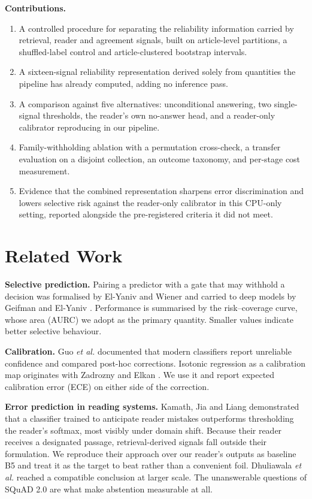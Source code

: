 \documentclass[conference]{IEEEtran}
\begin{document}
\noindent\textbf{Contributions.}
\begin{enumerate}\itemsep0.5pt
\item A controlled procedure for separating the reliability information carried by
retrieval, reader and agreement signals, built on article-level partitions, a
shuffled-label control and article-clustered bootstrap intervals.
\item A sixteen-signal reliability representation derived solely from quantities
the pipeline has already computed, adding no inference pass.
\item A comparison against five alternatives: unconditional answering, two
single-signal thresholds, the reader's own no-answer head, and a reader-only
calibrator reproducing \cite{kamath2020} in our pipeline.
\item Family-withholding ablation with a permutation cross-check, a transfer
evaluation on a disjoint collection, an outcome taxonomy, and per-stage cost
measurement.
\item Evidence that the combined representation sharpens error discrimination and
lowers selective risk against the reader-only calibrator in this CPU-only setting,
reported alongside the pre-registered criteria it did not meet.
\end{enumerate}

\section{Related Work}
\textbf{Selective prediction.} Pairing a predictor with a gate that may withhold a
decision was formalised by El-Yaniv and Wiener \cite{elyaniv2010} and carried to
deep models by Geifman and El-Yaniv \cite{geifman2017}. Performance is summarised
by the risk--coverage curve, whose area (AURC) we adopt as the primary quantity.
Smaller values indicate better selective behaviour.

\textbf{Calibration.} Guo \emph{et al.} \cite{guo2017} documented that modern
classifiers report unreliable confidence and compared post-hoc corrections.
Isotonic regression as a calibration map originates with Zadrozny and Elkan
\cite{zadrozny2002}. We use it and report expected calibration error (ECE) on
either side of the correction.

\textbf{Error prediction in reading systems.} Kamath, Jia and Liang
\cite{kamath2020} demonstrated that a classifier trained to anticipate reader
mistakes outperforms thresholding the reader's softmax, most visibly under domain
shift. Because their reader receives a designated passage, retrieval-derived
signals fall outside their formulation. We reproduce their approach over our
reader's outputs as baseline B5 and treat it as the target to beat rather than a
convenient foil. Dhuliawala \emph{et al.} \cite{dhuliawala2022} reached a
compatible conclusion at larger scale. The unanswerable questions of SQuAD 2.0
\cite{rajpurkar2018} are what make abstention measurable at all.
\end{document}
